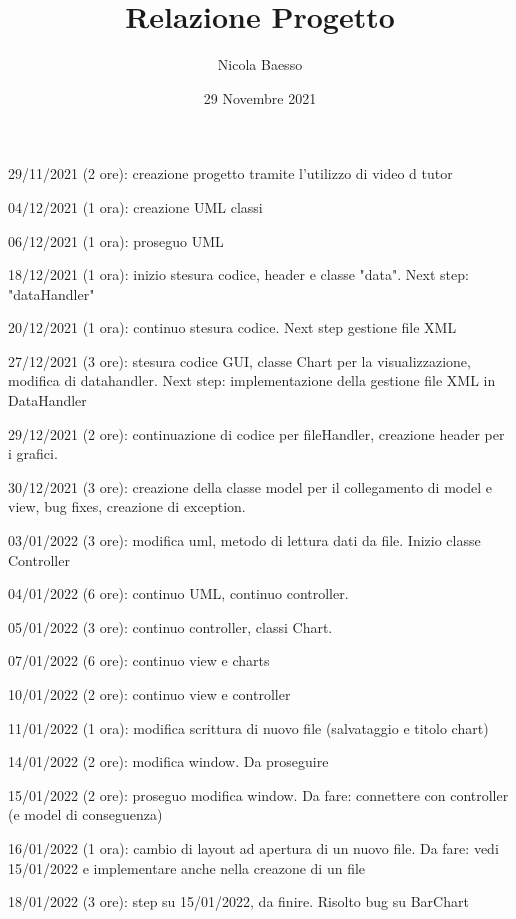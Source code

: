 \documentclass[10pt]{article}
\author{Nicola Baesso}
\title{Relazione Progetto}
\date{29 Novembre 2021}
\begin{document}
	\setlength{\baselineskip}{13 pt}
	
	\maketitle
	
	
	29/11/2021 (2 ore): creazione progetto tramite l'utilizzo di video d tutor
	
	04/12/2021 (1 ora): creazione UML classi
	
	06/12/2021 (1 ora): proseguo UML
	
	18/12/2021 (1 ora): inizio stesura codice, header e classe "data". Next step: "dataHandler"
	
	20/12/2021 (1 ora): continuo stesura codice. Next step gestione file XML
	
	27/12/2021 (3 ore): stesura codice GUI, classe Chart per la visualizzazione, modifica di datahandler. Next step: implementazione della gestione file XML in DataHandler
	
	29/12/2021 (2 ore): continuazione di codice per fileHandler, creazione header per i grafici.
     
    30/12/2021 (3 ore): creazione della classe model per il collegamento di model e view, bug fixes, creazione di exception.
    
    03/01/2022 (3 ore): modifica uml, metodo di lettura dati da file. Inizio classe Controller
    
    04/01/2022 (6 ore): continuo UML, continuo controller.
    
    05/01/2022 (3 ore): continuo controller, classi Chart.
    
    07/01/2022 (6 ore): continuo view e charts
    
    10/01/2022 (2 ore): continuo view e controller
    
    11/01/2022 (1 ora): modifica scrittura di nuovo file (salvataggio e titolo chart)
    
    14/01/2022 (2 ore): modifica window. Da proseguire
    
    15/01/2022 (2 ore): proseguo modifica window. Da fare: connettere con controller (e model di conseguenza)
    
    16/01/2022 (1 ora): cambio di layout ad apertura di un nuovo file. Da fare: vedi 15/01/2022 e implementare anche nella creazone di un file
    
    18/01/2022 (3 ore): step su 15/01/2022, da finire. Risolto bug su BarChart
    
\end{document}
